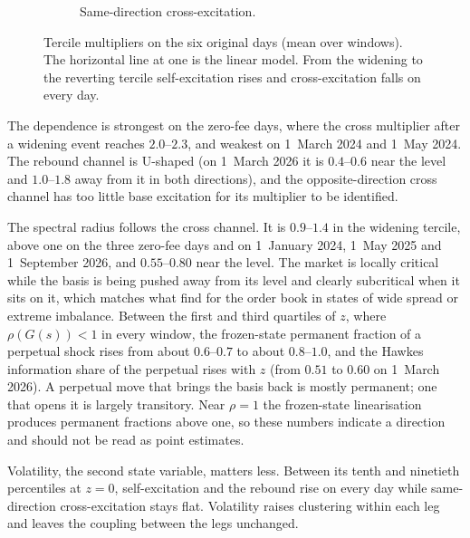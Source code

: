 \documentclass[a4paper,11pt]{article}
\begin{document}
\begin{figure}[htbp]
\begin{subfigure}[t]{0.48\textwidth}
\caption{Same-direction cross-excitation.}
\end{subfigure}
\caption{Tercile multipliers on the six original days (mean over windows). The horizontal line at one is the linear model. From the widening to the reverting tercile self-excitation rises and cross-excitation falls on every day.}
\label{fig:terciles}
\end{figure}

The dependence is strongest on the zero-fee days, where the cross multiplier after a widening event reaches $2.0$--$2.3$, and weakest on 1~March 2024 and 1~May 2024. The rebound channel is U-shaped (on 1~March 2026 it is $0.4$--$0.6$ near the level and $1.0$--$1.8$ away from it in both directions), and the opposite-direction cross channel has too little base excitation for its multiplier to be identified.

The spectral radius follows the cross channel. It is $0.9$--$1.4$ in the widening tercile, above one on the three zero-fee days and on 1~January 2024, 1~May 2025 and 1~September 2026, and $0.55$--$0.80$ near the level. The market is locally critical while the basis is being pushed away from its level and clearly subcritical when it sits on it, which matches what \cite{morariupatrichi2022} find for the order book in states of wide spread or extreme imbalance. Between the first and third quartiles of $z$, where $\rho(G(s)) < 1$ in every window, the frozen-state permanent fraction of a perpetual shock rises from about $0.6$--$0.7$ to about $0.8$--$1.0$, and the Hawkes information share of the perpetual rises with $z$ (from $0.51$ to $0.60$ on 1~March 2026). A perpetual move that brings the basis back is mostly permanent; one that opens it is largely transitory. Near $\rho = 1$ the frozen-state linearisation produces permanent fractions above one, so these numbers indicate a direction and should not be read as point estimates.

Volatility, the second state variable, matters less. Between its tenth and ninetieth percentiles at $z = 0$, self-excitation and the rebound rise on every day while same-direction cross-excitation stays flat. Volatility raises clustering within each leg and leaves the coupling between the legs unchanged.
\end{document}
